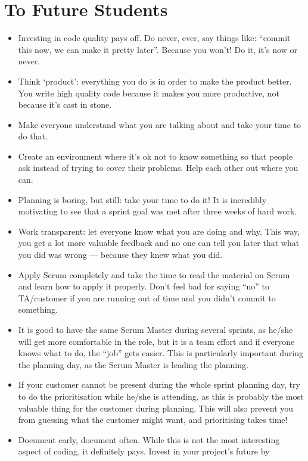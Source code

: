 \documentclass[11pt,a4paper]{report}
\begin{document}
\section*{To Future Students}
\begin{itemize}
\item Investing in code quality pays off. Do never, ever, say things like:
  ``commit this now, we can make it pretty later''. Because you won't!  Do it,
  it's now or never.
\item Think `product': everything you do is in order to make the product better.
  You write high quality code because it makes you more productive, not because
  it's cast in stone.
\item Make everyone understand what you are talking about and take your time to
  do that.
\item Create an environment where it's ok not to know something so that people
  ask instead of trying to cover their problems. Help each other out where you
  can.
\item Planning is boring, but still: take your time to do it! It is incredibly
  motivating to see that a sprint goal was met after three weeks of hard work.
\item Work transparent: let everyone know what you are doing and why. This way,
  you get a lot more valuable feedback and no one can tell you later that what
  you did was wrong --- because they knew what you did.
\item Apply Scrum completely and take the time to read the material on Scrum and
  learn how to apply it properly. Don't feel bad for saying ``no'' to
  TA/customer if you are running out of time and you didn't commit to something.
\item It is good to have the same Scrum Master during several sprints, as he/she
  will get more comfortable in the role, but it is a team effort and if everyone
  knows what to do, the ``job'' gets easier. This is particularly important
  during the planning day, as the Scrum Master is leading the planning.
\item If your customer cannot be present during the whole sprint planning day,
  try to do the prioritisation while he/she is attending, as this is probably
  the most valuable thing for the customer during planning. This will also
  prevent you from guessing what the customer might want, and prioritising takes
  time!
\item Document early, document often. While this is not the most interesting
  aspect of coding, it definitely pays. Invest in your project's future by

\end{itemize}
\end{document}
